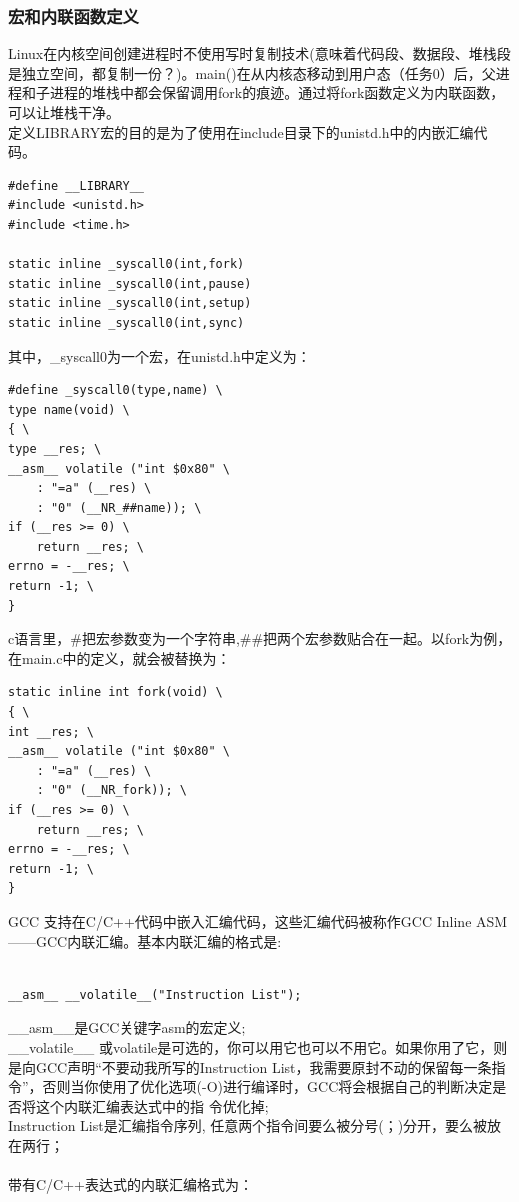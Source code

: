\documentclass[12pt]{article}
\begin{document}
\subsubsection{宏和内联函数定义}	
Linux在内核空间创建进程时不使用写时复制技术(意味着代码段、数据段、堆栈段是独立空间，都复制一份？)。main()在从内核态移动到用户态（任务0）后，父进程和子进程的堆栈中都会保留调用fork的痕迹。通过将fork函数定义为内联函数，可以让堆栈干净。\\
定义LIBRARY宏的目的是为了使用在include目录下的unistd.h中的内嵌汇编代码。
\begin{lstlisting}
#define __LIBRARY__
#include <unistd.h>
#include <time.h>

static inline _syscall0(int,fork)
static inline _syscall0(int,pause)
static inline _syscall0(int,setup)
static inline _syscall0(int,sync)
\end{lstlisting}
其中，\_syscall0为一个宏，在unistd.h中定义为：
\begin{lstlisting}
#define _syscall0(type,name) \
type name(void) \
{ \
type __res; \
__asm__ volatile ("int $0x80" \
	: "=a" (__res) \
	: "0" (__NR_##name)); \
if (__res >= 0) \
	return __res; \
errno = -__res; \
return -1; \
}
\end{lstlisting}
c语言里，\#把宏参数变为一个字符串,\#\#把两个宏参数贴合在一起。以fork为例，在main.c中的定义，就会被替换为：
\begin{lstlisting}
static inline int fork(void) \
{ \
int __res; \
__asm__ volatile ("int $0x80" \
	: "=a" (__res) \
	: "0" (__NR_fork)); \
if (__res >= 0) \
	return __res; \
errno = -__res; \
return -1; \
}
\end{lstlisting}
GCC 支持在C/C++代码中嵌入汇编代码，这些汇编代码被称作GCC Inline ASM——GCC内联汇编。基本内联汇编的格式是:\\\\
\begin{lstlisting}
__asm__ __volatile__("Instruction List");
\end{lstlisting}
\_\_asm\_\_是GCC关键字asm的宏定义;\\
\_\_volatile\_\_ 或volatile是可选的，你可以用它也可以不用它。如果你用了它，则是向GCC声明“不要动我所写的Instruction List，我需要原封不动的保留每一条指令”，否则当你使用了优化选项(-O)进行编译时，GCC将会根据自己的判断决定是否将这个内联汇编表达式中的指 令优化掉;\\
Instruction List是汇编指令序列, 任意两个指令间要么被分号(；)分开，要么被放在两行； \\\\
带有C/C++表达式的内联汇编格式为：
\end{document}
